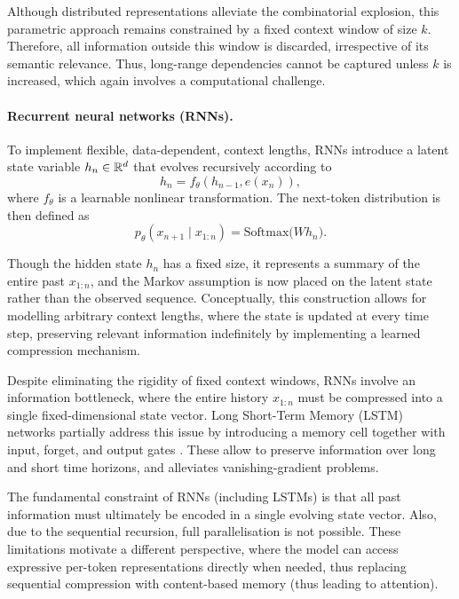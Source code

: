 \begin{remark}
Although distributed representations alleviate the combinatorial explosion, this parametric approach remains constrained by a fixed context window of size $k$. Therefore, all information outside this window is discarded, irrespective of its semantic relevance. Thus, long-range dependencies cannot be captured unless $k$ is increased, which again involves a computational challenge.
\end{remark}

\paragraph{Recurrent neural networks (RNNs).}

To implement flexible, data-dependent, context lengths, RNNs \cite{elman1990finding} introduce a latent state variable $h_n \in {\mathbb R}^d$ that evolves recursively according to
\[
h_n = f_\theta(h_{n-1}, e(x_n)),
\]
where $f_\theta$ is a learnable nonlinear transformation. The next-token distribution is then defined as
\[
p_\theta(x_{n+1} \mid x_{1:n})
=
\mathrm{Softmax}\big( W h_n \big).
\]

Though the hidden state $h_n$ has a fixed size, it represents a summary of the entire past $x_{1:n}$, and the Markov assumption is now placed on the latent state rather than the observed sequence. Conceptually, this construction allows for modelling arbitrary context lengths, where the state is updated at every time step, preserving relevant information indefinitely by implementing a learned compression mechanism.

Despite eliminating the rigidity of fixed context
windows, RNNs involve an information bottleneck, where the entire history $x_{1:n}$ must be compressed into a single fixed-dimensional state vector. Long Short-Term Memory (LSTM) networks partially address this issue by introducing a memory cell together with input, forget, and output gates \cite{hochreiter1997long}. These allow to preserve information over long and short time horizons, and alleviates vanishing-gradient problems.

\begin{remark}
The fundamental constraint of RNNs (including LSTMs) is that all past information must ultimately be encoded in a single evolving state vector. Also, due to the sequential recursion, full parallelisation is not possible. These limitations motivate a different perspective, where the model can access expressive per-token representations directly when needed, thus replacing sequential compression with content-based memory (thus leading to attention).
\end{remark}

